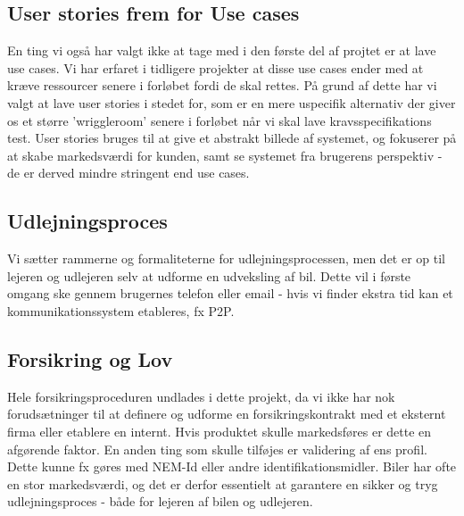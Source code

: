\documentclass[Rapport/Rapport_main.tex]{subfiles}
\begin{document}
\subsection{User stories frem for Use cases}
En ting vi også har valgt ikke at tage med i den første del af projtet er at lave use cases. Vi har erfaret i tidligere projekter at disse use cases ender med at kræve ressourcer senere i forløbet fordi de skal rettes. På grund af dette har vi valgt at lave user stories i stedet for,  som er en mere uspecifik alternativ der giver os et større 'wriggleroom' senere i forløbet når vi skal lave kravsspecifikations test. User stories bruges til at give et abstrakt billede af systemet, og fokuserer på at skabe markedsværdi for kunden, samt se systemet fra brugerens perspektiv - de er derved mindre stringent end use cases. 

\subsection{Udlejningsproces}
Vi sætter rammerne og formaliteterne for udlejningsprocessen, men det er op til lejeren og udlejeren selv at udforme en udveksling af bil. Dette vil i første omgang ske gennem brugernes telefon eller email - hvis vi finder ekstra tid kan et kommunikationssystem etableres, fx P2P.

\subsection{Forsikring og Lov}
Hele forsikringsproceduren undlades i dette projekt, da vi ikke har nok forudsætninger til at definere og udforme en forsikringskontrakt med et eksternt firma eller etablere en internt. Hvis produktet skulle markedsføres er dette en afgørende faktor. 
En anden ting som skulle tilføjes er validering af ens profil. Dette kunne fx gøres med NEM-Id eller andre identifikationsmidler. Biler har ofte en stor markedsværdi, og det er derfor essentielt at garantere en sikker og tryg udlejningsproces - både for lejeren af bilen og udlejeren.
\end{document}
